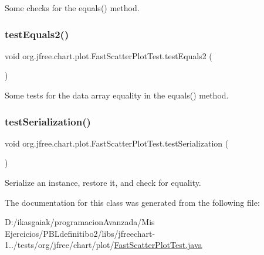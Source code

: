 Some checks for the equals() method. \mbox{\label{classorg_1_1jfree_1_1chart_1_1plot_1_1_fast_scatter_plot_test_a0d635140cf5f820b69d5e116047937a7}} 
\subsubsection{\texorpdfstring{test\+Equals2()}{testEquals2()}}
{\footnotesize\ttfamily void org.\+jfree.\+chart.\+plot.\+Fast\+Scatter\+Plot\+Test.\+test\+Equals2 (\begin{DoxyParamCaption}{ }\end{DoxyParamCaption})}

Some tests for the data array equality in the equals() method. \mbox{\label{classorg_1_1jfree_1_1chart_1_1plot_1_1_fast_scatter_plot_test_aa2e90ef51aeff4b865823824d5622721}} 
\subsubsection{\texorpdfstring{test\+Serialization()}{testSerialization()}}
{\footnotesize\ttfamily void org.\+jfree.\+chart.\+plot.\+Fast\+Scatter\+Plot\+Test.\+test\+Serialization (\begin{DoxyParamCaption}{ }\end{DoxyParamCaption})}

Serialize an instance, restore it, and check for equality. 

The documentation for this class was generated from the following file\+:\begin{DoxyCompactItemize}
\item 
D\+:/ikasgaiak/programacion\+Avanzada/\+Mis Ejercicios/\+P\+B\+Ldefinitibo2/libs/jfreechart-\/1../tests/org/jfree/chart/plot/\mbox{\hyperlink{_fast_scatter_plot_test_8java}{Fast\+Scatter\+Plot\+Test.\+java}}\end{DoxyCompactItemize}
